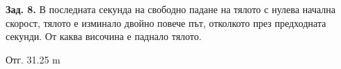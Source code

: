 \documentclass[a4paper,10pt]{article}
\begin{document}
\textbf{Зад. 8.}
В последната секунда на свободно падане на тялото с нулева начална скорост, тялото е изминало  двойно повече път, отколкото през предходната секунди.
От каква височина е паднало тялото.
\begin{flushright}
Отг. 31.25 m 
\end{flushright}

% 
% 
% 
% 
\end{document}
